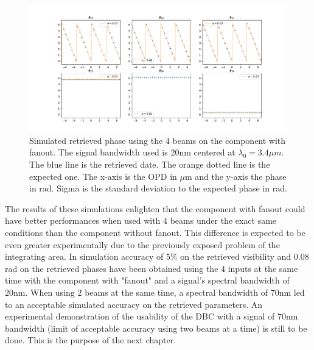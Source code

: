 \begin{figure}[htbp!]
\centering
\includegraphics[scale=.4]{../picture/4BL_20_fan_phase.pdf}
\caption{Simulated retrieved phase using the 4 beams on the component with fanout. The signal bandwidth used is 20nm centered at $ \lambda_0=3.4 \mu m$. The blue line is the retrieved date. The orange dotted line is the expected one. The x-axis is the OPD in $\mu$m and the y-axis the phase in rad. Sigma is the standard deviation to the expected phase in rad.}
\label{fig:4BL_sim_fan_phase}
\end{figure}



The results of these simulations enlighten that the component with fanout could have better performances when used with 4 beams under the exact same conditions than the component without fanout. This difference is expected to be even greater experimentally due to the previously exposed problem of the integrating area. In simulation accuracy of 5\% on the retrieved visibility and 0.08 rad on the retrieved phases have been obtained using the 4 inputs at the same time with the component with "fanout" and a signal's spectral bandwidth of 20nm. When using 2 beams at the same time, a spectral bandwidth of 70nm led to an acceptable simulated accuracy on the retrieved parameters. 
An experimental demonstration of the usability of the DBC with a signal of 70nm bandwidth (limit of acceptable accuracy using two beams at a time) is still to be done. This is the purpose of the next chapter.
